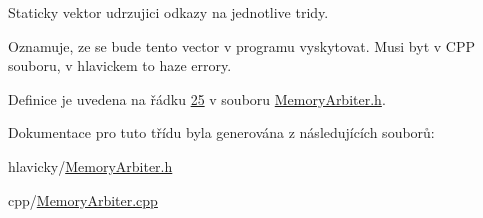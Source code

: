 Staticky vektor udrzujici odkazy na jednotlive tridy. 

Oznamuje, ze se bude tento vector v programu vyskytovat. Musi byt v C\+PP souboru, v hlavickem to haze errory. 

Definice je uvedena na řádku \hyperlink{MemoryArbiter_8h_source_l00025}{25} v souboru \hyperlink{MemoryArbiter_8h_source}{Memory\+Arbiter.\+h}.



Dokumentace pro tuto třídu byla generována z následujících souborů\+:\begin{DoxyCompactItemize}
\item 
hlavicky/\hyperlink{MemoryArbiter_8h}{Memory\+Arbiter.\+h}\item 
cpp/\hyperlink{MemoryArbiter_8cpp}{Memory\+Arbiter.\+cpp}\end{DoxyCompactItemize}
